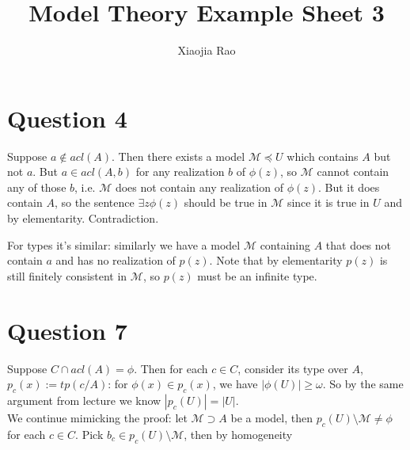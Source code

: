 \documentclass[a4paper]{article}
\begin{document}
\title{Model Theory Example Sheet 3}

\author{Xiaojia Rao}

\maketitle

\setcounter{secnumdepth}{0}

\section{Question 4}

Suppose $a \not\in acl(A)$. Then there exists a model $\mathcal{M} \preccurlyeq U$ which contains $A$ but not $a$. But $a \in acl(A,b)$ for any realization $b$ of $\phi(z)$, so $\mathcal{M}$ cannot contain any of those $b$, i.e. $\mathcal{M}$ does not contain any realization of $\phi(z)$. But it does contain $A$, so the sentence $\exists z \phi(z)$ should be true in $\mathcal{M}$ since it is true in $U$ and by elementarity. Contradiction.

For types it's similar: similarly we have a model $\mathcal{M}$ containing $A$ that does not contain $a$ and  has no realization of $p(z)$. Note that by elementarity $p(z)$ is still finitely consistent in $\mathcal{M}$, so $p(z)$ must be an infinite type.

\section{Question 7}

Suppose $C \cap acl(A) = \phi$. Then for each $c \in C$, consider its type over $A$, $p_c(x):=tp(c/A)$: for $\phi(x) \in p_c(x)$, we have $|\phi(U)| \geq \omega$. So by the same argument from lecture we know $|p_c(U)| = |U|$.\\
We continue mimicking the proof: let $\mathcal{M} \supset A$ be a model, then $p_c(U) \setminus \mathcal{M} \neq \phi$ for each $c \in C$. Pick $b_c \in p_c(U) \setminus \mathcal{M}$, then by homogeneity
\end{document}
